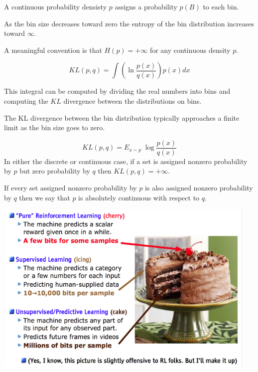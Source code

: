 {\vfill
A continuous probability densisty $p$ assigns a probability $p(B)$ to each bin.

\vfill
As the bin size decreases toward zero the entropy of the bin distribution increases toward $\infty$.

\vfill
A meaningful convention is that $H(p) = +\infty$ for any continuous density $p$.


$$KL(p,q) = \int \left( \ln \frac{p(x)}{q(x)}\right) p(x) dx$$

\vfill
This integral can be computed by dividing the real numbers into bins and computing the $KL$ divergence between the distributions on bins.

\vfill
The KL divergence between the bin distribution typically approaches a finite limit as the bin size goes to zero.


$$KL(p,q) = E_{x \sim p}\; \log\frac{p(x)}{q(x)}$$
\vfill
In either the discrete or continuous case, if a set is assigned nonzero probability by $p$ but zero probability by $q$ then $KL(p,q) = +\infty$.

\vfill
If every set assigned nonzero probability by $p$ is also assigned nonzero probability by $q$ then we say that $p$ is absolutely continuous with respect to $q$.



\centerline{\includegraphics[width = 6in]{../images/cake}}

}
